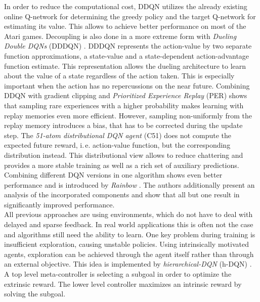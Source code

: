 	In order to reduce the computational cost, DDQN utilizes the already existing online Q-network for determining the greedy policy and the target Q-network for estimating its value. 
	This allows to achieve better performance on most of the Atari games. 
	Decoupling is also done in a more extreme form with \textit{Dueling Double DQNs} (DDDQN) \cite{Wang2016}. 
	DDDQN represents the action-value by two separate function approximations, a state-value and a state-dependent action-advantage function estimate.
	This representation allows the dueling architecture to learn about the value of a state regardless of the action taken. 
	This is especially important when the action has no repercussions on the near future. 
	Combining DDQN with gradient clipping and \textit{Prioritized Experience Replay} (PER) \cite{Schaul2015} shows that sampling rare experiences with a higher probability makes learning with replay memories even more efficient. 
	However, sampling non-uniformly from the replay memory introduces a bias, that has to be corrected during the update step.
	The \textit{51-atom distributional DQN agent} (C51) \cite{Bellemare2017} does not compute the expected future reward, i.\,e. action-value function, but the corresponding distribution instead. 
	This distributional view allows to reduce chattering and provides a more stable training as well as a rich set of auxiliary predictions.
	Combining different DQN versions in one algorithm shows even better performance and is introduced by \textit{Rainbow} \cite{Hessel2018}.
	The authors additionally present an analysis of the incorporated components and show that all but one result in significantly improved performance.\\
	All previous approaches are using environments, which do not have to deal with delayed and sparse feedback.
	In real world applications this is often not the case and algorithms still need the ability to learn.
	One key problem during training is insufficient exploration, causing unstable policies. 
	Using intrinsically motivated agents, exploration can be achieved through the agent itself rather than through an external objective. 
	This idea is implemented by \textit{hierarchical-DQN} (h-DQN) \cite{Kulkarni2016}.
	A top level meta-controller is selecting a subgoal in order to optimize the extrinsic reward.
	The lower level controller maximizes an intrinsic reward by solving the subgoal.
